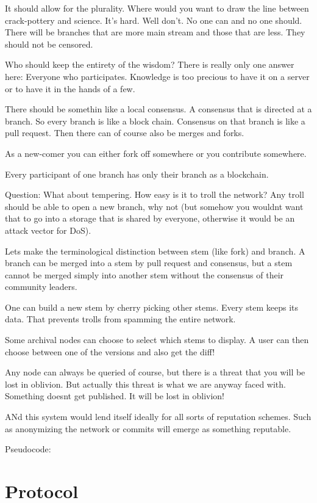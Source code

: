 \documentclass[14pt]{article}
\begin{document}
It should allow for the plurality. Where would you want to draw the line between crack-pottery and science. It's hard. Well don't. No one can and no one should. There will be branches that are more main stream and those that are less. They should not be censored. 

Who should keep the entirety of the wisdom? There is really only one answer here: Everyone who participates. Knowledge is too precious to have it on a server or to have it in the hands of a few. 


There should be somethin like a local consensus. A consensus that is directed at a branch. So every branch is like a block chain. Consensus on that branch is like a pull request. Then there can of course also be merges and forks. 

As a new-comer you can either fork off somewhere or you contribute somewhere. 

Every participant of one branch has only their branch as a blockchain. 

Question: What about tempering. How easy is it to troll the network? Any troll should be able to open a new branch, why not (but somehow you wouldnt want that to go into a storage that is shared by everyone, otherwise it would be an attack vector for DoS). 

Lets make the terminological distinction between stem (like fork) and branch. A branch can be merged into a stem by pull request and consensus, but a stem cannot be merged simply into another stem without the consensus of their community leaders. 

One can build a new stem by cherry picking other stems. Every stem keeps its data. That prevents trolls from spamming the entire network.

Some archival nodes can choose to select which stems to display. 
A user can then choose between one of the versions and also get the diff! 

Any node can always be queried of course, but there is a threat that you will be lost in oblivion. But actually this threat is what we are anyway faced with. Something doesnt get published. It will be lost in oblivion!

ANd this system would lend itself ideally for all sorts of reputation schemes. Such as anonymizing the network or commits will emerge as something reputable. 

Pseudocode:


\section{Protocol}
\end{document}

